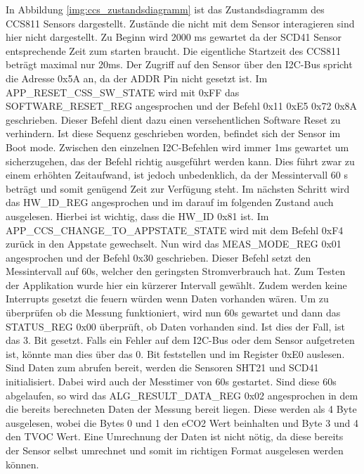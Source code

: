 \documentclass[]{article}
\begin{document}
			In Abbildung \ref{img:ccs_zustandsdiagramm} ist das Zustandsdiagramm des CCS811 Sensors dargestellt. Zustände die nicht mit dem Sensor interagieren sind hier nicht dargestellt. Zu Beginn wird 2000 ms gewartet da der SCD41 Sensor entsprechende Zeit zum starten braucht. Die eigentliche Startzeit des CCS811 beträgt maximal nur 20ms. Der Zugriff auf den Sensor über den I2C-Bus spricht die Adresse 0x5A an, da der ADDR Pin nicht gesetzt ist. Im APP\_RESET\_CSS\_SW\_STATE wird mit 0xFF das SOFTWARE\_RESET\_REG angesprochen und der Befehl 0x11 0xE5 0x72 0x8A geschrieben. Dieser Befehl dient dazu einen versehentlichen Software Reset zu verhindern. Ist diese Sequenz geschrieben worden, befindet sich der Sensor im Boot mode. Zwischen den einzelnen I2C-Befehlen wird immer 1ms gewartet um sicherzugehen, das der Befehl richtig ausgeführt werden kann. Dies führt zwar zu einem erhöhten Zeitaufwand, ist jedoch unbedenklich, da der Messintervall 60 s beträgt und somit genügend Zeit zur Verfügung steht. Im nächsten Schritt wird das HW\_ID\_REG angesprochen und im darauf im folgenden Zustand auch ausgelesen. Hierbei ist wichtig, dass die HW\_ID 0x81 ist. Im APP\_CCS\_CHANGE\_TO\_APPSTATE\_STATE wird mit dem Befehl 0xF4 zurück in den Appstate gewechselt. Nun wird das MEAS\_MODE\_REG 0x01 angesprochen und der Befehl 0x30 geschrieben. Dieser Befehl setzt den Messintervall auf 60s, welcher den geringsten Stromverbrauch hat. Zum Testen der Applikation wurde hier ein kürzerer Intervall gewählt. Zudem werden keine Interrupts gesetzt die feuern würden wenn Daten vorhanden wären. Um zu überprüfen ob die Messung funktioniert, wird nun 60s gewartet und dann das STATUS\_REG 0x00 überprüft, ob Daten vorhanden sind. Ist dies der Fall, ist das 3. Bit gesetzt. Falls ein Fehler auf dem I2C-Bus oder dem Sensor aufgetreten ist, könnte man dies über das 0. Bit feststellen und im Register 0xE0 auslesen. Sind Daten zum abrufen bereit, werden die Sensoren SHT21 und SCD41 initialisiert. Dabei wird auch der Messtimer von 60s gestartet. Sind diese 60s abgelaufen, so wird das ALG\_RESULT\_DATA\_REG 0x02 angesprochen in dem die bereits berechneten Daten der Messung bereit liegen. Diese werden als 4 Byte ausgelesen, wobei die Bytes 0 und 1 den eCO2 Wert beinhalten und Byte 3 und 4 den TVOC Wert. Eine Umrechnung der Daten ist nicht nötig, da diese bereits der Sensor selbst umrechnet und somit im richtigen Format ausgelesen werden können.
\end{document}
